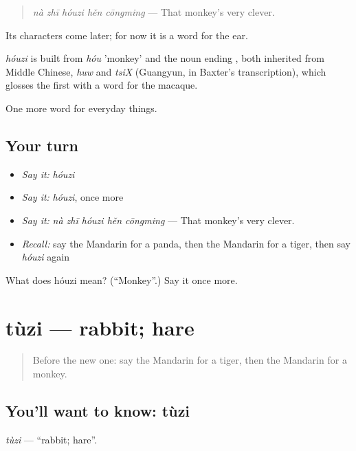 \begin{quote}
\emph{nà zhī hóuzi hěn cōngming} — That monkey's very clever.
\end{quote}

Its characters come later; for now it is a word for the ear.

\begin{cousinweb}
\emph{hóuzi} is built from \emph{hóu} 'monkey' and the noun ending , both inherited from Middle Chinese, \emph{huw} and \emph{tsiX} (Guangyun, in Baxter's transcription), which glosses the first with a word for the macaque.
\end{cousinweb}

\begin{grammarlens}[title={What you've built}]
One more word for everyday things.
\end{grammarlens}

\subsection*{Your turn}
\begin{itemize}
\raggedright
  \item \emph{Say it:} \emph{hóuzi}
  \item \emph{Say it:} \emph{hóuzi}, once more
  \item \emph{Say it:} \emph{nà zhī hóuzi hěn cōngming} — That monkey's very clever.
  \item \emph{Recall:} say the Mandarin for a panda, then the Mandarin for a tiger, then say \emph{hóuzi} again
\end{itemize}

\begin{tcolorbox}[breakable,colback=teal!4,colframe=teal!35!black,title={Before you move on}]
What does hóuzi mean? (\textquotedblleft{}Monkey\textquotedblright{}.) Say it once more.
\end{tcolorbox}
\section[tùzi]{tùzi — rabbit; hare}

\label{lesson:ZH-C223-tuzi}



\begin{quote}
Before the new one: say the Mandarin for a tiger, then the Mandarin for a monkey.
\end{quote}

\subsection*{You'll want to know: tùzi}
\emph{tùzi} — \textquotedblleft{}rabbit; hare\textquotedblright{}.

